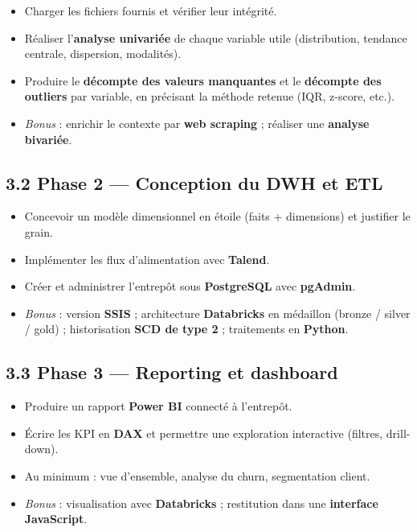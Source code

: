\documentclass[11pt,a4paper]{article}
\providecommand{\tightlist}{\setlength{\itemsep}{0pt}\setlength{\parskip}{0pt}}
\begin{document}
\begin{itemize}
\tightlist
\item
  Charger les fichiers fournis et vérifier leur intégrité.
\item
  Réaliser l'\textbf{analyse univariée} de chaque variable utile
  (distribution, tendance centrale, dispersion, modalités).
\item
  Produire le \textbf{décompte des valeurs manquantes} et le
  \textbf{décompte des outliers} par variable, en précisant la méthode
  retenue (IQR, z-score, etc.).
\item
  \emph{Bonus} : enrichir le contexte par \textbf{web scraping} ;
  réaliser une \textbf{analyse bivariée}.
\end{itemize}

\subsection{3.2 Phase 2 --- Conception du DWH et
ETL}\label{phase-2-conception-du-dwh-et-etl}

\begin{itemize}
\tightlist
\item
  Concevoir un modèle dimensionnel en étoile (faits + dimensions) et
  justifier le grain.
\item
  Implémenter les flux d'alimentation avec \textbf{Talend}.
\item
  Créer et administrer l'entrepôt sous \textbf{PostgreSQL} avec
  \textbf{pgAdmin}.
\item
  \emph{Bonus} : version \textbf{SSIS} ; architecture
  \textbf{Databricks} en médaillon (bronze / silver / gold) ;
  historisation \textbf{SCD de type 2} ; traitements en \textbf{Python}.
\end{itemize}

\subsection{3.3 Phase 3 --- Reporting et
dashboard}\label{phase-3-reporting-et-dashboard}

\begin{itemize}
\tightlist
\item
  Produire un rapport \textbf{Power BI} connecté à l'entrepôt.
\item
  Écrire les KPI en \textbf{DAX} et permettre une exploration
  interactive (filtres, drill-down).
\item
  Au minimum : vue d'ensemble, analyse du churn, segmentation client.
\item
  \emph{Bonus} : visualisation avec \textbf{Databricks} ; restitution
  dans une \textbf{interface JavaScript}.
\end{itemize}
\end{document}
